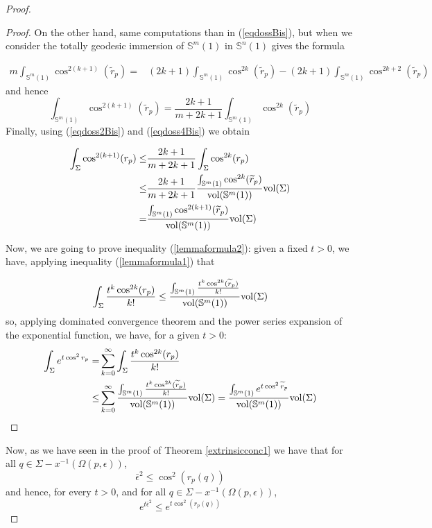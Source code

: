 \documentclass[11pt,letterpaper]{amsart}
\theoremstyle{definition}
\theoremstyle{remark}
\newcommand{\ese}{\mathbb{S}}
\begin{document}
\begin{proof}
\begin{proof}
On the other hand, same computations than in (\ref{eqdossBis}), but when we consider the totally geodesic immersion of $\ese^m(1)$ in $\ese^n(1)$ gives the formula

$$
\begin{aligned}
m\int_{\ese^m(1)} \cos^{2(k+1)}(\widetilde{r}_p)=&(2k+1)\int_{\ese^m(1)}\cos^{2k}(\widetilde{r}_p)-(2k+1)\int_{\ese^m(1)} \cos^{2k+2}(\widetilde{r}_p)
\end{aligned}
$$
and hence
\begin{equation}\label{eqdoss4Bis}
\int_{\ese^m(1)} \cos^{2(k+1)}(\widetilde{r}_p)=\frac{2k+1}{m+2k+1}\int_{\ese^m(1)}\cos^{2k}(\widetilde{r}_p)
\end{equation}
Finally, using (\ref{eqdoss2Bis}) and (\ref{eqdoss4Bis}) we obtain

\begin{equation}\label{eqdoss5Bis}
\begin{aligned}
\int_\Sigma \cos^{2(k+1)}(r_p)\leq& \frac{2k+1}{m+2k+1}\int_\Sigma \cos^{2k}(r_p)\\  \leq & \frac{2k+1}{m+2k+1}\frac{\int_{\mathbb{S}^m(1)} \cos^{2k}(\widetilde{r}_p)}{{\rm vol}(\mathbb{S}^m(1))} {\rm vol}(\Sigma)\\
=&\frac{\int_{\mathbb{S}^m(1)} \cos^{2(k+1)}(\widetilde{r}_p)}{{\rm vol}(\mathbb{S}^m(1))} {\rm vol}(\Sigma)
\end{aligned}
\end{equation}

Now, we are going to prove inequality (\ref{lemmaformula2}): given a fixed $t>0$, we have, applying inequality (\ref{lemmaformula1}) that

$$\int_\Sigma\frac{t^k \cos^{2k}(r_p)}{k!} \leq \frac{\int_{\mathbb{S}^m(1)}\frac{t^k \cos^{2k}(\widetilde{r}_p)}{k!}}{{\rm vol}(\mathbb{S}^m(1))} {\rm vol}(\Sigma)$$
 so, applying dominated convergence theorem and the power series expansion of the exponential function, we have, for a given $t>0$:
$$
\begin{aligned}
\int_{\Sigma} e^{t \cos^2r_p} =&\sum_{k=0}^\infty \int_\Sigma\frac{t^k \cos^{2k}(r_p)}{k!} \\
\leq& 
\sum_{k=0}^\infty \frac{\int_{\mathbb{S}^m(1)}\frac{t^k \cos^{2k}(\widetilde{r}_p)}{k!}}{{\rm vol}(\mathbb{S}^m(1))} {\rm vol}(\Sigma)=\frac{\int_{\ese^m(1)} e^{t \cos^2\widetilde{r}_p}}{{\rm vol}(\mathbb{S}^m(1))} {\rm vol}(\Sigma)
\end{aligned}
$$
\end{proof}
Now, as we have seen in the proof of Theorem \ref{extrinsicconc1}
we have that for all  $q \in\Sigma-x^{-1}(\Omega(p,\epsilon))$, 
$$ \bar\epsilon^2 \leq \cos^2(r_p(q))$$
and hence, for every $t >0$, and for all $q \in \Sigma- x^{-1}(\Omega(p,\epsilon))$,
$$e^{t\bar\epsilon^2} \leq e^{t\cos^2(r_p(q))} $$


\end{proof}
\end{document}
